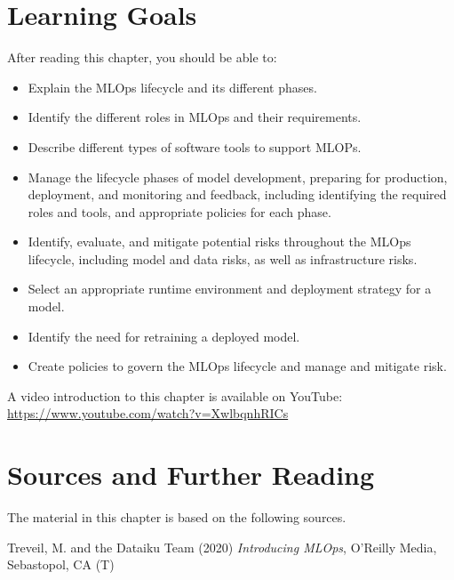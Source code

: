 %
%
\section*{Learning Goals}

After reading this chapter, you should be able to:
\begin{itemize}
    \item Explain the MLOps lifecycle and its different phases. 
    \item Identify the different roles in MLOps and their requirements.
    \item Describe different types of software tools to support MLOPs.
    \item Manage the lifecycle phases of model development, preparing for production, deployment, and monitoring and feedback, including identifying the required roles and tools, and appropriate policies for each phase.
    \item Identify, evaluate, and mitigate potential risks throughout the MLOps lifecycle, including model and data risks, as well as infrastructure risks.
    \item Select an appropriate runtime environment and deployment strategy for a model.
    \item Identify the need for retraining a deployed model.
    \item Create policies to govern the MLOps lifecycle and manage and mitigate risk.
\end{itemize}

\begin{advanced}
\begin{videobox}
A video introduction to this chapter is available on YouTube:\\

\url{https://www.youtube.com/watch?v=XwlbqnhRICs}
\end{videobox}
\end{advanced}

\newpage
\section*{Sources and Further Reading}

The material in this chapter is based on the following sources. 

\begin{resourcebox}
Treveil, M. and the Dataiku Team (2020) \emph{Introducing MLOps}, O'Reilly Media, Sebastopol, CA (T) 
\end{resourcebox}

